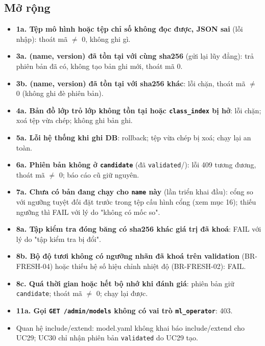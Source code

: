 \subsection{Mở rộng}
\begin{itemize}
\item \textbf{1a. Tệp mô hình hoặc tệp chỉ số không đọc được, JSON sai} (lỗi nhập): thoát mã \ensuremath{\neq} 0, không ghi gì.
\item \textbf{3a. (name, version) đã tồn tại với cùng sha256} (gửi lại lũy đẳng): trả phiên bản đã có, không tạo bản ghi mới, thoát mã 0.
\item \textbf{3b. (name, version) đã tồn tại với sha256 khác}: lỗi chặn, thoát mã \ensuremath{\neq} 0 (không ghi đè phiên bản).
\item \textbf{4a. Bản đồ lớp trỏ lớp không tồn tại hoặc {\small\texttt{class\_\allowbreak{}\allowbreak{}index}} bị hở}: lỗi chặn; xoá tệp vừa chép; không ghi bản ghi.
\item \textbf{5a. Lỗi hệ thống khi ghi DB}: rollback; tệp vừa chép bị xoá; chạy lại an toàn.
\item \textbf{6a. Phiên bản không ở {\small\texttt{candidate}}} (đã {\small\texttt{validated}}/): lỗi 409 tương đương, thoát mã \ensuremath{\neq} 0; báo cáo cũ giữ nguyên.
\item \textbf{7a. Chưa có bản đang chạy cho {\small\texttt{name}} này} (lần triển khai đầu): cổng so với ngưỡng tuyệt đối đặt trước trong tệp cấu hình cổng (xem mục 16); thiếu ngưỡng thì FAIL với lý do "không có mốc so".
\item \textbf{8a. Tập kiểm tra đóng băng có sha256 khác giá trị đã khoá}: FAIL với lý do "tập kiểm tra bị đổi".
\item \textbf{8b. Bộ độ tươi không có ngưỡng nhãn đã khoá trên validation} (BR-\allowbreak{}FRESH-\allowbreak{}04) hoặc thiếu hệ số hiệu chỉnh nhiệt độ (BR-\allowbreak{}FRESH-\allowbreak{}02): FAIL.
\item \textbf{8c. Quá thời gian hoặc hết bộ nhớ khi đánh giá}: phiên bản giữ {\small\texttt{candidate}}; thoát mã \ensuremath{\neq} 0; chạy lại được.
\item \textbf{11a. Gọi {\small\texttt{GET /\allowbreak{}\allowbreak{}admin/\allowbreak{}\allowbreak{}models}} không có vai trò {\small\texttt{ml\_\allowbreak{}\allowbreak{}operator}}}: 403.
\item Quan hệ include/\allowbreak{}extend: model.yaml không khai báo include/\allowbreak{}extend cho UC29; UC30 chỉ nhận phiên bản {\small\texttt{validated}} do UC29 tạo.
\end{itemize}
